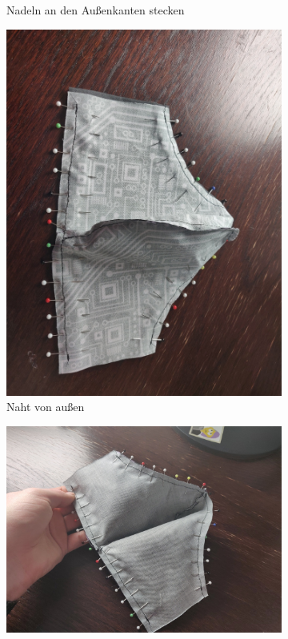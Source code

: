 \documentclass[12pt,parskip=full]{scrartcl}
\begin{document}
\begin{figure}[ht]
\begin{subfigure}{0.48\textwidth}
        \caption{Nadeln an den Außenkanten stecken}
        \label{OuterSeam4}
    \end{subfigure}
    \begin{subfigure}{0.48\textwidth}
        \centering
        \includegraphics[width = \linewidth]{Pictures/05_OuterSeam/OuterSeam5_resized.jpg}
        \caption{Naht von außen}
        \label{OuterSeam5}
    \end{subfigure}
    \begin{subfigure}{0.48\textwidth}
        \centering
        \includegraphics[width = \linewidth]{Pictures/05_OuterSeam/OuterSeam6_resized.jpg}

\end{subfigure}
\end{figure}
\end{document}
